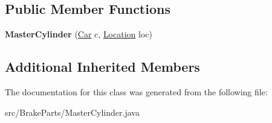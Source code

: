 \subsection*{Public Member Functions}
\begin{DoxyCompactItemize}
\item 
\hypertarget{classBrakeParts_1_1MasterCylinder_a7b0567a8c777405ac6a60e6d7ce19137}{}{\bfseries Master\+Cylinder} (\hyperlink{classCars_1_1Car}{Car} c, \hyperlink{enumEnums_1_1Location}{Location} loc)\label{classBrakeParts_1_1MasterCylinder_a7b0567a8c777405ac6a60e6d7ce19137}

\end{DoxyCompactItemize}
\subsection*{Additional Inherited Members}


The documentation for this class was generated from the following file\+:\begin{DoxyCompactItemize}
\item 
src/\+Brake\+Parts/Master\+Cylinder.\+java\end{DoxyCompactItemize}
